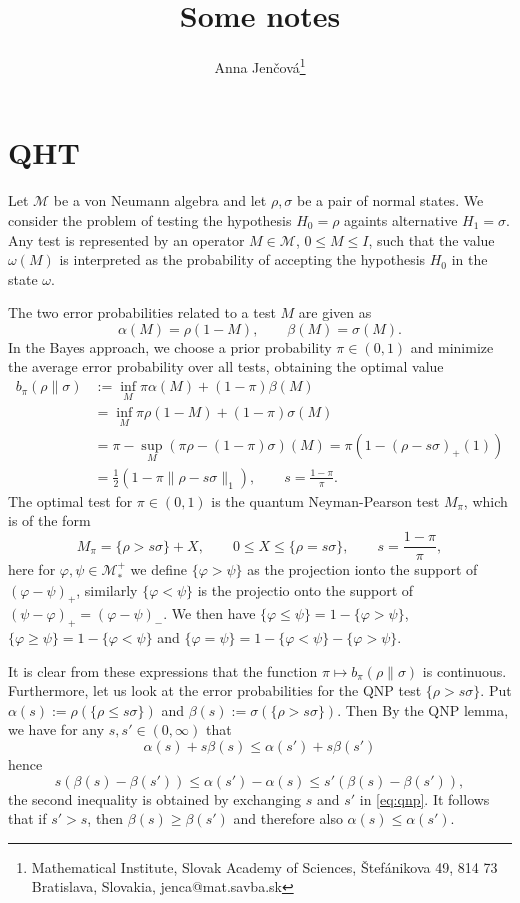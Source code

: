 \documentclass[12pt]{article}
\title{Some notes}
\author{Anna Jen\v cov\'a\footnote{Mathematical Institute, Slovak Academy of Sciences, \v
Stef\'anikova 49, 814 73 Bratislava, Slovakia, jenca@mat.savba.sk}}
\date{}
\theoremstyle{definition}
\theoremstyle{remark}
\def\Me{\mathcal M}
\begin{document}
\maketitle

\section{QHT}


Let $\Me$ be a von Neumann algebra and let $\rho,\sigma$ be a pair of normal states. 
We consider the problem of testing the
hypothesis $H_0=\rho$ againts alternative $H_1=\sigma$. Any test is represented by an
operator $M\in \Me$, $0\le M\le I$, such that the value $\omega(M)$ is interpreted as the
probability of accepting the hypothesis $H_0$ in the state $\omega$.

The two error probabilities related to a test $M$ are given as
\[
\alpha(M)=\rho(1-M),\qquad \beta(M)=\sigma(M).
\]
In the Bayes approach, we choose a prior probability $\pi\in (0,1)$ and minimize the
average error probability over all tests, obtaining the optimal value
\begin{align*}
b_\pi(\rho\|\sigma)&:=\inf_{M} \pi\alpha(M)+(1-\pi)\beta(M)\\
&=\inf_M\pi\rho(1-M)+(1-\pi)\sigma(M)\\
&= \pi -\sup_M (\pi\rho-(1-\pi)\sigma)(M)=\pi(1-(\rho-s\sigma)_+(1))\\
&= \frac12(1-\pi\|\rho-s\sigma\|_1),\qquad
s=\frac{1-\pi}{\pi}.
\end{align*}
The optimal test for $\pi\in (0,1)$ is the quantum Neyman-Pearson test $M_\pi$, which is of the form
\[
M_\pi=\{\rho>s\sigma\}+ X,\qquad 0\le X\le \{\rho=s\sigma\},\qquad s=\frac{1-\pi}{\pi},
\]
here for $\varphi,\psi\in \Me^+_*$ we define $\{\varphi>\psi\}$ as the projection ionto
the support of $(\varphi-\psi)_+$, similarly $\{\varphi<\psi\}$ is the projectio onto the
support of $(\psi-\varphi)_+=(\varphi-\psi)_-$. We then have
$\{\varphi\le\psi\}=1-\{\varphi>\psi\}$, $\{\varphi\ge \psi\}=1-\{\varphi<\psi\}$ and 
$\{\varphi=\psi\}=1-\{\varphi<\psi\}-\{\varphi>\psi\}$.


It is clear from
these expressions that the function $\pi\mapsto b_\pi(\rho\|\sigma)$ is continuous.  
Furthermore, let us look at the error probabilities for the QNP test $\{\rho>s\sigma\}$. 
Put $\alpha(s):=\rho(\{\rho\le s\sigma\})$ and $\beta(s):=\sigma(\{\rho>s\sigma\})$. Then 
By the QNP lemma, we have for any $s,s'\in (0,\infty)$ that 
\begin{equation}\label{eq:qnp}
\alpha(s)+s\beta(s)\le \alpha(s')+s\beta(s')
\end{equation}
hence 
\[
s(\beta(s)-\beta(s'))\le \alpha(s')-\alpha(s)\le s'(\beta(s)-\beta(s')),
\]
the second inequality is obtained by exchanging $s$ and $s'$ in \eqref{eq:qnp}. It follows
that if $s'>s$, then $\beta(s)\ge \beta(s')$ and therefore also $\alpha(s)\le \alpha(s')$. 
\end{document}
